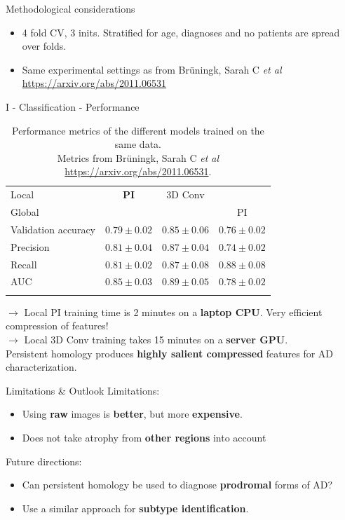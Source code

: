 \documentclass[aspectratio=169, 10pt, dvipsnames]{beamer}
\begin{document}
\begin{frame}[fragile]{Methodological considerations}
  \begin{itemize}
  \item 4 fold CV, 3 inits. Stratified for age, diagnoses and no patients are spread over folds.
  \item Same experimental settings as from Br{\"u}ningk, Sarah C \textit{et al} \url{https://arxiv.org/abs/2011.06531}
  \end{itemize}
\end{frame}

\begin{frame}[fragile]{I - Classification - Performance}
\begin{table}
  \centering
  \begin{tabular}{lccc}
    \toprule
    Local & \textbf{PI} & 3D Conv & \\
    Global &&& PI\\
    \midrule
    Validation accuracy & $0.79\pm 0.02$ & $0.85\pm 0.06$ & $ 0.76\pm 0.02$ \\
    Precision & $0.81\pm 0.04$  & $0.87\pm0.04$ &  $0.74\pm 0.02$ \\
    Recall & $0.81\pm 0.02$ & $0.87\pm0.08$ & $0.88\pm 0.08$\\
    AUC & $0.85\pm 0.03$ & $0.89\pm0.05$ &  $ 0.78\pm 0.02$\\
    \bottomrule
    \vspace{1pt}
  \end{tabular}
  \caption{Performance metrics of the different models trained on the same data. \\Metrics from Br{\"u}ningk, Sarah C \textit{et al} \url{https://arxiv.org/abs/2011.06531}.}
  \label{tab:performance}
\end{table}
\pause$\rightarrow$ Local PI training time is 2 minutes on a \textbf{laptop CPU}. Very efficient compression of features! \\
$\rightarrow$  Local 3D Conv training takes 15 minutes on a \textbf{server GPU}.\\
\pause Persistent homology produces \textbf{highly salient compressed} features for AD characterization.
\end{frame}


\begin{frame}[fragile]{Limitations \& Outlook \map}
  Limitations:
  \begin{itemize}
    \item Using \textbf{raw} images is \textbf{better}, but more \textbf{expensive}.
     \item Does not take atrophy from \textbf{other regions} into account
  \end{itemize}
  Future directions:
  \begin{itemize}
     \item Can persistent homology be used to diagnose \textbf{prodromal} forms of AD?
     \item Use a similar approach for \textbf{subtype identification}.
  \end{itemize}
\end{frame}
\end{document}
